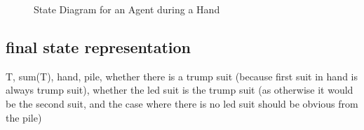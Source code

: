 \documentclass[10pt]{article} %
\begin{document}

\begin{figure}[h!]
\centering
{}
\caption{State Diagram for an Agent during a Hand}
\label{fig:states}
\end{figure}

\subsection{final state representation}

T, sum(T), hand, pile, whether there is a trump suit (because first suit in hand is always trump suit), whether the led suit is the trump suit (as otherwise it would be the second suit, and the case where there is no led suit should be obvious from the pile)
\end{document}
